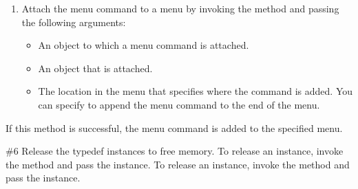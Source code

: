 \documentclass[letterpaper,12pt,english,openany,oneside]{sphinxmanual}
\begin{document}
\begin{sphinxVerbatim}[commandchars=\\\{\}]
    
           
\end{sphinxVerbatim}
\begin{enumerate}
%
\setcounter{enumi}{4}
\item {} 
Attach the menu command to a menu by invoking the  method and passing the following arguments:
\begin{itemize}
\item {} 
An  object to which a menu command is attached.

\item {} 
An  object that is attached.

\item {} 
The location in the menu that specifies where the command is added. You can specify  to append the menu command to the end of the menu.

\end{itemize}

\end{enumerate}

If this method is successful, the menu command is added to the specified menu.

\begin{sphinxVerbatim}[commandchars=\\\{\}]
        
  
\end{sphinxVerbatim}

\#6 Release the typedef instances to free memory. To release an  instance, invoke the  method and pass the  instance. To release an  instance, invoke the  method and pass the  instance.
\end{document}
